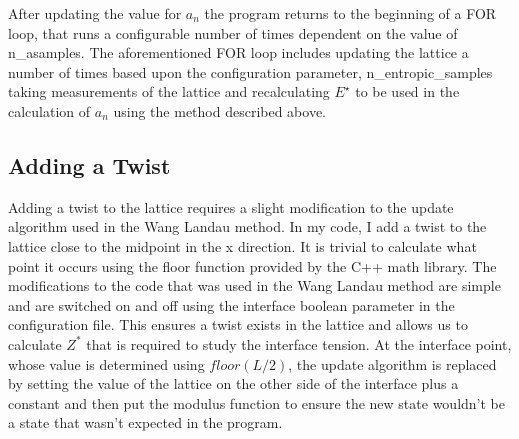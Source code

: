 After updating the value for $a_n$ the program returns to the beginning of a FOR loop, that runs a configurable number of times dependent on the value of n\_asamples.
The aforementioned FOR loop includes updating the lattice a number of times based upon the configuration parameter, n\_entropic\_samples taking measurements of the lattice and recalculating $E^{\star}$ to be used in the calculation of $a_n$ using the method described above.

\subsection{Adding a Twist}
Adding a twist to the lattice requires a slight modification to the update algorithm used in the Wang Landau method.
In my code, I add a twist to the lattice close to the midpoint in the x direction. It is trivial to calculate what point it occurs using the floor function provided by the C++ math library.
The modifications to the code that was used in the Wang Landau method are simple and are switched on and off using the interface boolean parameter in the configuration file.
This ensures a twist exists in the lattice and allows us to calculate $Z^*$ that is required to study the interface tension.
At the interface point, whose value is determined using $floor(L/2)$, the update algorithm is replaced by setting the value of the lattice on the other side of the interface plus a constant and then put the modulus function to ensure the new state wouldn't be a state that wasn't expected in the program.

